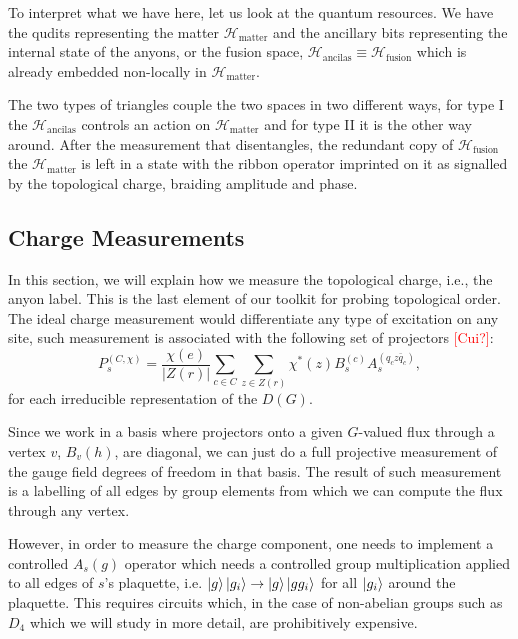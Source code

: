 \documentclass[two column]{article}
\newcommand{\caro}[1]{\textcolor{red}{[#1]}}
\begin{document}
To interpret what we have here, let us look at the quantum resources. We have the qudits representing the matter $\mathcal{H}_{\text{matter}}$ and the ancillary bits representing the internal state of the anyons, or the fusion space, $\mathcal{H}_{\text{ancilas}} \equiv \mathcal{H}_{\text{fusion}}$ which is already embedded non-locally in  $\mathcal{H}_{\text{matter}}$.

The two types of triangles couple the two spaces in two different ways, for type I the $\mathcal{H}_{\text{ancilas}}$ controls an action on $\mathcal{H}_{\text{matter}}$ and for type II it is the other way around. After the measurement that disentangles, the redundant copy of $\mathcal{H}_{\text{fusion}}$ the $\mathcal{H}_{\text{matter}}$ is left in a state with the ribbon operator imprinted on it as signalled by the topological charge, braiding amplitude and phase.


\subsection{Charge Measurements}\label{sec:redchmmt}

In this section, we will explain how we measure the topological charge, i.e., the anyon label. This is the last element of our toolkit for probing topological order. The ideal charge measurement would differentiate any type of excitation on any site, such measurement is associated with the following set of projectors \caro{Cui?}\cite{}:
\begin{equation}
    P_s^{(C, \chi)} = \frac{\chi(e)}{|Z(r)|}\sum_{c \in C}\sum_{z \in Z(r)}\chi^*(z)B_s^{(c)}A_s^{(q_c z \bar{q}_c)},
\end{equation}
for each irreducible representation of the $D(G)$.

Since we work in a basis where projectors onto a given $G$-valued flux through a vertex $v$, $B_v{(h)}$, are diagonal, we can just do a full projective measurement of the gauge field degrees of freedom in that basis. 
The result of such measurement is a labelling of all edges by group elements from which we can compute the flux through any vertex. 

However, in order to measure the charge component, one needs to implement a controlled $A_s{(g)}$ operator which needs a controlled group multiplication applied to all edges of $s$'s plaquette, i.e. $\ket{g}\ket{g_i} \rightarrow \ket{g}\ket{gg_i}$ for all $\ket{g_i}$ around the plaquette.
This requires circuits which, in the case of non-abelian groups such as $D_4$ which we will study in more detail, are prohibitively expensive. 
\end{document}
